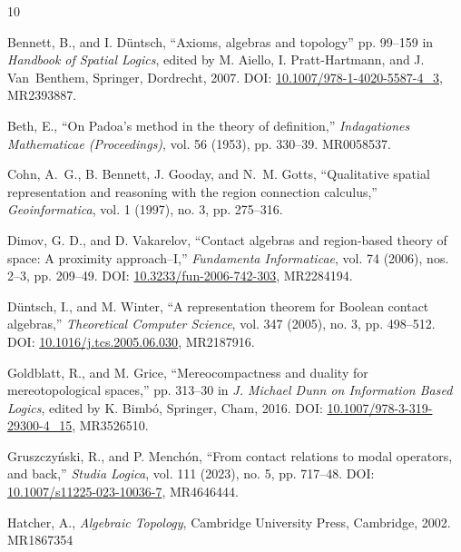 \documentclass[a4paper,12pt]{amsart}
\numberwithin{equation}{section}
\theoremstyle{mytheoremstyle}
\begin{document}
\begin{thebibliography}{10}

Bennett, B., and I. D\"{u}ntsch,
\newblock ``Axioms, algebras and topology''
\newblock pp. 99--159 in \emph{Handbook of Spatial Logics}, edited by M. Aiello, I. Pratt-Hartmann, and J. Van~Benthem, Springer, Dordrecht, 2007.
\newblock DOI: \url{10.1007/978-1-4020-5587-4\_3}, MR2393887.


Beth, E.,
\newblock ``On Padoa's method in the theory of definition,''
\newblock \emph{Indagationes Mathematicae (Proceedings)}, vol. 56 (1953), pp. 330--39.
\newblock MR0058537.

Cohn, A.~G., B. Bennett, J. Gooday, and N.~M. Gotts,
\newblock ``Qualitative spatial representation and reasoning with the region connection calculus,''
\newblock \emph{Geoinformatica}, vol. 1 (1997), no. 3, pp. 275--316.


Dimov, G. D., and D. Vakarelov,
\newblock ``Contact algebras and region-based theory of space: A proximity approach--I,''
\newblock \emph{Fundamenta Informaticae}, vol. 74 (2006), nos. 2--3, pp. 209--49.
\newblock DOI: \url{10.3233/fun-2006-742-303}, MR2284194.

D\"{u}ntsch, I., and M. Winter,
\newblock ``A representation theorem for Boolean contact algebras,''
\newblock \emph{Theoretical Computer Science}, vol. 347 (2005), no. 3, pp. 498--512.
\newblock DOI: \url{10.1016/j.tcs.2005.06.030}, MR2187916.


Goldblatt, R., and M. Grice,
\newblock ``Mereocompactness and duality for mereotopological spaces,''
\newblock pp. 313--30 in \emph{J. Michael Dunn on Information Based Logics},
edited by K. Bimb\'o, Springer, Cham, 2016.
\newblock DOI: \url{10.1007/978-3-319-29300-4_15}, MR3526510.


Gruszczy\'{n}ski, R., and P. Mench\'{o}n,
\newblock ``From contact relations to modal operators, and back,''
\newblock \emph{Studia Logica}, vol. 111 (2023), no. 5, pp. 717--48.
\newblock DOI: \url{10.1007/s11225-023-10036-7}, MR4646444.

Hatcher, A.,
\newblock \emph{Algebraic Topology},
\newblock Cambridge University Press, Cambridge, 2002.
MR1867354


\end{thebibliography}
\end{document}
